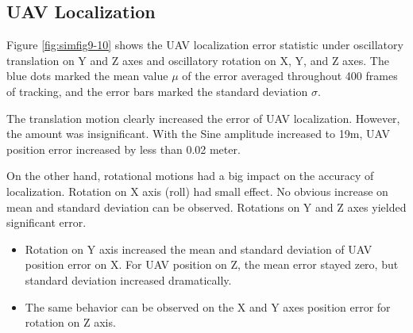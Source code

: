 \subsection{UAV Localization}\label{localization_motion}

Figure \ref{fig:simfig9-10} shows the UAV localization error statistic
under oscillatory translation on Y and Z axes and oscillatory rotation
on X, Y, and Z axes. The blue dots marked the mean value $\mu$ of the
error averaged throughout 400 frames of tracking, and the error bars
marked the standard deviation $\sigma$.

The translation motion clearly increased the error of UAV
localization. However, the amount was insignificant. With the Sine
amplitude increased to 19m, UAV position error increased by less than
0.02 meter.

On the other hand, rotational motions had a big impact on the accuracy
of localization. Rotation on X axis (roll) had small effect. No
obvious increase on mean and standard deviation can be
observed. Rotations on Y and Z axes yielded significant error.

\begin{itemize}
  \item Rotation on Y axis increased the mean and standard deviation
  of UAV position error on X. For UAV position on Z, the mean
  error stayed zero, but standard deviation increased dramatically.
  \item The same behavior can be observed on the X and Y axes position
  error for rotation on Z axis.
\end{itemize}

